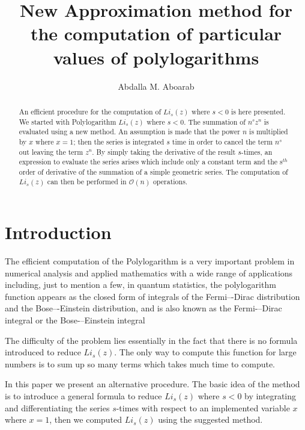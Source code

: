 \documentclass{amsart}
\numberwithin{equation}{section}
\begin{document}
 
\title{New Approximation method for the computation of particular values of polylogarithms}

\author{Abdalla M. Aboarab}
\address{\sl Junior Student at Kafr El-Sheikh STEM School\\
E--mail: abdulah.10840@stemksheikh.moe.edu.eg}


\begin{abstract}
An efficient procedure for the computation of $Li_{s}(z)$ where $s<0$
is here presented. We started with Polylogarithm $Li_{s}(z)$ where $s<0$. The summation of $n^{s}z^{n}$ is evaluated using a new method. An assumption is made that the power $n$ is multiplied by $x$ where $x=1$; then the series is integrated $s$ time in order to cancel the term $n^s$ out leaving the term $z^n$. By simply taking the derivative of the result $s$-times, an expression to evaluate the series arises which include only a constant term and the s$^{th}$ order of derivative of the summation of a simple geometric series.
The computation of $Li_{s}(z)$ can then be performed in $\mathcal{O}(n)$ operations.
\end{abstract}

\maketitle

\section{Introduction}
\label{se:introduction}

The efficient computation of the Polylogarithm 
is a very important problem in numerical analysis and applied mathematics
with a wide range of applications including, just to mention a few,
in quantum statistics, the polylogarithm function appears as the closed form of integrals of the Fermi–-Dirac distribution and the Bose–-Einstein distribution, and is also known as the Fermi-–Dirac integral or the Bose-–Einstein integral\cite{DLMF} 

The difficulty of the problem lies essentially
in the fact that there is no formula introduced to reduce $Li_{s}(z)$. The only way to compute this function for large numbers is to sum up so many terms which takes much time to compute.

In this paper we present an alternative procedure.
The basic idea of the method is to introduce a general formula to reduce $Li_{s}(z)$ where $s<0$ by integrating and differentiating the series $s$-times with respect to an implemented variable $x$ where $x=1$, then we computed $Li_{s}(z)$ using the suggested method.
\end{document}
